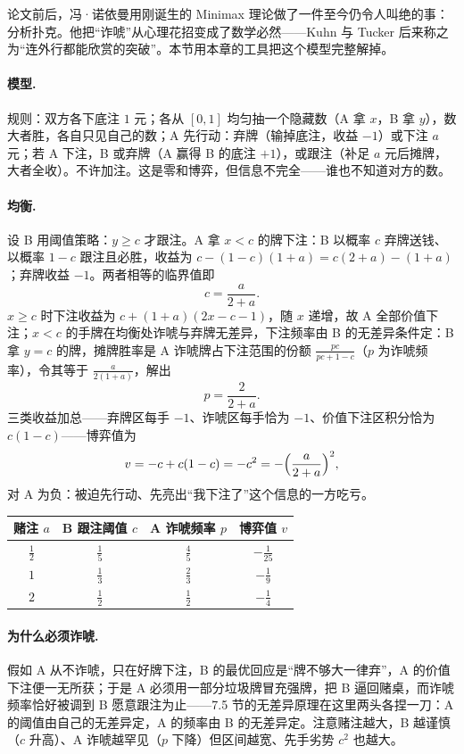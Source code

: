 \documentclass[UTF8,a4paper,11pt,oneside,openany,fontset=fandol]{ctexbook}
\theoremstyle{definition}
\begin{document}
论文前后，冯·诺依曼用刚诞生的 Minimax 理论做了一件至今仍令人叫绝的事：分析扑克。他把“诈唬”从心理花招变成了数学必然——Kuhn 与 Tucker 后来称之为“连外行都能欣赏的突破”。本节用本章的工具把这个模型完整解掉。

\paragraph{模型.} 规则：双方各下底注 $1$ 元；各从 $[0,1]$ 均匀抽一个隐藏数（A 拿 $x$，B 拿 $y$），数大者胜，各自只见自己的数；A 先行动：弃牌（输掉底注，收益 $-1$）或下注 $a$ 元；若 A 下注，B 或弃牌（A 赢得 B 的底注 $+1$），或跟注（补足 $a$ 元后摊牌，大者全收）。不许加注。这是零和博弈，但信息不完全——谁也不知道对方的数。

\paragraph{均衡.} 设 B 用阈值策略：$y\ge c$ 才跟注。A 拿 $x<c$ 的牌下注：B 以概率 $c$ 弃牌送钱、以概率 $1-c$ 跟注且必胜，收益为 $c-(1-c)(1+a)=c(2+a)-(1+a)$；弃牌收益 $-1$。两者相等的临界值即
\[
 c=\frac{a}{2+a}.
\]
$x\ge c$ 时下注收益为 $c+(1+a)(2x-c-1)$，随 $x$ 递增，故 A 全部价值下注；$x<c$ 的手牌在均衡处诈唬与弃牌无差异，下注频率由 B 的无差异条件定：B 拿 $y=c$ 的牌，摊牌胜率是 A 诈唬牌占下注范围的份额 $\tfrac{pc}{pc+1-c}$（$p$ 为诈唬频率），令其等于 $\tfrac{a}{2(1+a)}$，解出
\[
 p=\frac{2}{2+a}.
\]
三类收益加总——弃牌区每手 $-1$、诈唬区每手恰为 $-1$、价值下注区积分恰为 $c(1-c)$——博弈值为
\[
 v=-c+c(1-c)=-c^{2}=-\Bigl(\frac{a}{2+a}\Bigr)^{2},
\]
对 A 为负：被迫先行动、先亮出“我下注了”这个信息的一方吃亏。

\begin{center}
\begin{tabular}{cccc}
\toprule
赌注 $a$ & B 跟注阈值 $c$ & A 诈唬频率 $p$ & 博弈值 $v$\\
\midrule
$\tfrac12$ & $\tfrac15$ & $\tfrac45$ & $-\tfrac1{25}$\\
$1$ & $\tfrac13$ & $\tfrac23$ & $-\tfrac19$\\
$2$ & $\tfrac12$ & $\tfrac12$ & $-\tfrac14$\\
\bottomrule
\end{tabular}
\end{center}

\paragraph{为什么必须诈唬.} 假如 A 从不诈唬，只在好牌下注，B 的最优回应是“牌不够大一律弃”，A 的价值下注便一无所获；于是 A 必须用一部分垃圾牌冒充强牌，把 B 逼回赌桌，而诈唬频率恰好被调到 B 愿意跟注为止——7.5 节的无差异原理在这里两头各捏一刀：A 的阈值由自己的无差异定，A 的频率由 B 的无差异定。注意赌注越大，B 越谨慎（$c$ 升高）、A 诈唬越罕见（$p$ 下降）但区间越宽、先手劣势 $c^{2}$ 也越大。
\end{document}
